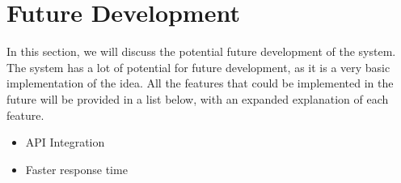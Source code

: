 \section{Future Development}\label{sec:future-development}

In this section, we will discuss the potential future development of the system.
The system has a lot of potential for future development, as it is a very basic implementation of the idea.
All the features that could be implemented in the future will be provided in a list below, with an expanded
explanation of each feature.

\begin{itemize}
    \item API Integration

    \item Faster response time
\end{itemize}



